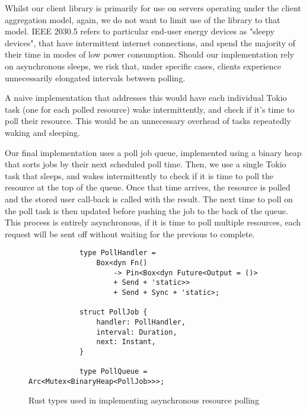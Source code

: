 Whilst our client library is primarily for use on servers operating under the client aggregation model, again, we do not want to limit use of the library to that model. IEEE 2030.5 refers to particular end-user energy devices as "sleepy devices", that have intermittent internet connections, and spend the majority of their time in modes of low power consumption. Should our implementation rely on asynchronous sleeps, we risk that, under specific cases, clients experience unnecessarily elongated intervals between polling.

A naive implementation that addresses this would have each individual Tokio task (one for each polled resource) wake intermittently, and check if it's time to poll their resource. This would be an unnecessary overhead of tasks repeatedly waking and sleeping.

Our final implementation uses a poll job queue, implemented using a binary heap that sorts jobs by their next scheduled poll time. Then, we use a single Tokio task that sleeps, and wakes intermittently to check if it is time to poll the resource at the top of the queue. Once that time arrives, the resource is polled and the stored user call-back is called with the result. The next time to poll on the poll task is then updated before pushing the job to the back of the queue. This process is entirely asynchronous, if it is time to poll multiple resources, each request will be sent off without waiting for the previous to complete. 

\begin{figure}[h]
    \begin{center}
        \begin{lstlisting}
            type PollHandler =
                Box<dyn Fn() 
                    -> Pin<Box<dyn Future<Output = ()> 
                    + Send + 'static>> 
                    + Send + Sync + 'static>;

            struct PollJob {
                handler: PollHandler,
                interval: Duration,
                next: Instant,
            }

            type PollQueue = Arc<Mutex<BinaryHeap<PollJob>>>;

        \end{lstlisting}
        \label{fig:pollimplds}
        \vspace{-10pt}
        \caption{Rust types used in implementing asynchronous resource polling}
    \end{center}
\end{figure}

